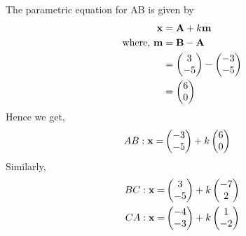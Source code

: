 \solution
The parametric equation for AB is given by
\begin{align}
\mathbf{x} &= \mathbf{A} + k\mathbf{m}\\
\text{where, } \mathbf{m} &= \mathbf{B} -\mathbf{A}\\
&= \begin{pmatrix}3 \\ -5\end{pmatrix} -\begin{pmatrix}-3\\ -5\end{pmatrix}\\
&= \begin{pmatrix}6 \\0\end{pmatrix}
\end{align}
Hence we get,
\begin{align}
AB: \mathbf{x} = &\begin{pmatrix}-3\\-5\end{pmatrix} + k \begin{pmatrix}6\\0\end{pmatrix}
\end{align}
Similarly, 
\begin{align}
BC: \mathbf{x} = &\begin{pmatrix}3\\-5\end{pmatrix} + k \begin{pmatrix}-7\\2\end{pmatrix}\\
CA: \mathbf{x} = &\begin{pmatrix}-4\\-3\end{pmatrix} + k \begin{pmatrix}1\\-2\end{pmatrix}
\end{align}
